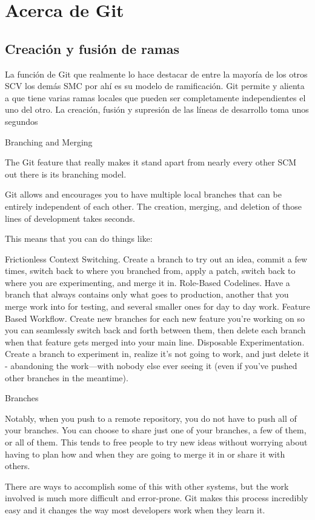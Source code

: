 \documentclass[12pt, spanish, oneside, onecolumn, a4paper]{report}
\begin{document}
\section{Acerca de Git}
\label{sec:aboutgit}

\subsection{Creación y fusión de ramas}
\label{sec:branchingandmerging}

La función de Git que realmente lo hace destacar de entre la mayoría de los otros SCV los demás SMC por ahí es su modelo de
ramificación. Git permite y alienta a que tiene varias ramas locales
que pueden ser completamente independientes el uno del otro. La
creación, fusión y supresión de las líneas de desarrollo toma unos
segundos

Branching and Merging

The Git feature that really makes it stand apart from nearly every other SCM out there is its branching model.

Git allows and encourages you to have multiple local branches that can be entirely independent of each other. The creation, merging, and deletion of those lines of development takes seconds.

This means that you can do things like:

    Frictionless Context Switching. Create a branch to try out an idea, commit a few times, switch back to where you branched from, apply a patch, switch back to where you are experimenting, and merge it in.
    Role-Based Codelines. Have a branch that always contains only what goes to production, another that you merge work into for testing, and several smaller ones for day to day work.
    Feature Based Workflow. Create new branches for each new feature you're working on so you can seamlessly switch back and forth between them, then delete each branch when that feature gets merged into your main line.
    Disposable Experimentation. Create a branch to experiment in, realize it's not going to work, and just delete it - abandoning the work—with nobody else ever seeing it (even if you've pushed other branches in the meantime).

Branches

Notably, when you push to a remote repository, you do not have to push all of your branches. You can choose to share just one of your branches, a few of them, or all of them. This tends to free people to try new ideas without worrying about having to plan how and when they are going to merge it in or share it with others.

There are ways to accomplish some of this with other systems, but the work involved is much more difficult and error-prone. Git makes this process incredibly easy and it changes the way most developers work when they learn it. 


\glsaddall
\printglossaries
\end{document}
